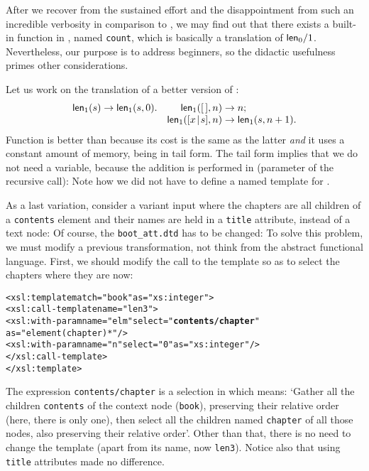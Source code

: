 After we recover from the sustained effort and the disappointment from
such an incredible verbosity in comparison to \Erlang, we may find out
that there exists a built\hyp{}in function in \XPath, named
\texttt{count}, which is basically a translation of
\(\textsf{len}_0/1\). Nevertheless, our purpose is to address beginners,
so the didactic usefulness primes other considerations.

Let us work on the translation of a better version of
:
\begin{equation*}
\begin{array}{@{}r@{\;}l@{\;}lr@{\;}l@{\;}l@{}}
\fun{len}_1(s) & \rightarrow & \fun{len}_1(s,0). &
\fun{len}_1(\el,n) & \rightarrow & n;\\
&&& \fun{len}_1(\cons{x}{s},n) & \rightarrow & \fun{len}_1(s,n+1).
\end{array}
\end{equation*}
Function  is better than  because
its cost is the same as the latter \emph{and} it uses a constant
amount of memory, being in tail form. The tail form implies that we do
not need a variable, because the addition is performed in \XPath
(parameter of the recursive call):
\noindent Note how we did not have to define a named template for
.

As a last variation, consider a variant input where the chapters are
all children of a \texttt{contents} element and their names are held
in a \texttt{title} attribute, instead of a text node:
\noindent Of course, the \DTD \texttt{boot\_att.dtd} has to be
changed: 
\noindent To solve this problem, we must modify a previous \XSLT
transformation, not think from the abstract functional language.
First, we should modify the call to the template so as to select the
chapters where they are now:
\begin{alltt}
  <xsl:template match="book" as="xs:integer">
    <xsl:call-template name="len3">
      <xsl:with-param name="elm" select="\textbf{contents/chapter}"
                                 as="element(chapter)*"/>
      <xsl:with-param name="n" select="0" as="xs:integer"/>
    </xsl:call-template>
  </xsl:template>
\end{alltt}
The expression \texttt{contents/chapter} is a selection in \XPath
which means: `Gather all the children \texttt{contents} of the context
node (\texttt{book}), preserving their relative order (here, there is
only one), then select all the children named \texttt{chapter} of all
those nodes, also preserving their relative order'. Other than that,
there is no need to change the template (apart from its name, now
\texttt{len3}). Notice also that using \texttt{title} attributes made
no difference.

